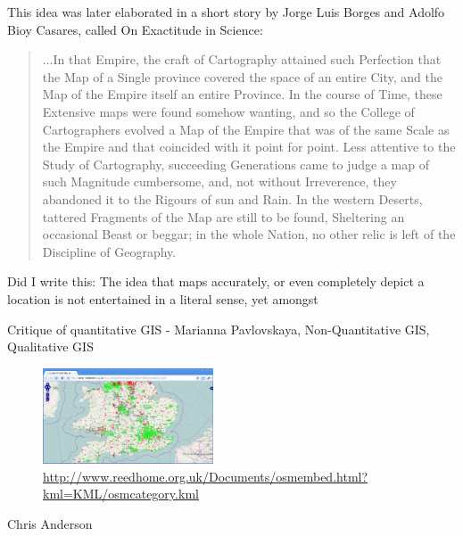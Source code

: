 \documentclass[11pt]{report}
\begin{document}
This idea was later elaborated in a short story by Jorge Luis Borges and Adolfo Bioy Casares, called On Exactitude in Science:

\begin{quote}
...In that Empire, the craft of Cartography attained such Perfection that the Map of a Single province covered the space of an entire City, and the Map of the Empire itself an entire Province. In the course of Time, these Extensive maps were found somehow wanting, and so the College of Cartographers evolved a Map of the Empire that was of the same Scale as the Empire and that coincided with it point for point. Less attentive to the Study of Cartography, succeeding Generations came to judge a map of such Magnitude cumbersome, and, not without Irreverence, they abandoned it to the Rigours of sun and Rain. In the western Deserts, tattered Fragments of the Map are still to be found, Sheltering an occasional Beast or beggar; in the whole Nation, no other relic is left of the Discipline of Geography.
\cite{borges1946exactitude}
\end{quote}

Did I write this: The idea that maps accurately, or even completely depict a location is not entertained in a literal sense, yet amongst

Critique of quantitative GIS - Marianna Pavlovskaya, Non-Quantitative GIS, Qualitative GIS


\begin{figure}
	\begin{flushright}
		\includegraphics[width=0.45\textwidth]{images/osm-missing-parts.png}
	\caption{\url{http://www.reedhome.org.uk/Documents/osmembed.html?kml=KML/osmcategory.kml}}
	\end{flushright}
\end{figure}

Chris Anderson 

\end{document}
